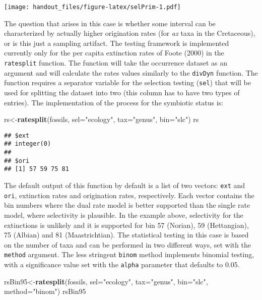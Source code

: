 \documentclass[]{article}
\newenvironment{Shaded}{\begin{snugshade}}{\end{snugshade}}
\newcommand{\DataTypeTok}[1]{\textcolor[rgb]{0.13,0.29,0.53}{#1}}
\newcommand{\KeywordTok}[1]{\textcolor[rgb]{0.13,0.29,0.53}{\textbf{#1}}}
\newcommand{\NormalTok}[1]{#1}
\newcommand{\StringTok}[1]{\textcolor[rgb]{0.31,0.60,0.02}{#1}}
\begin{document}
\texttt{[image: handout\_files/figure-latex/selPrim-1.pdf]}

The question that arises in this case is whether some interval can be
characterized by actually higher origination rates (for \emph{az} taxa
in the Cretaceous), or is this just a sampling artifact. The testing
framework is implemented currently only for the per capita extinction
rates of Foote (2000) in the \texttt{ratesplit} function. The function
will take the occurrence dataset as an argument and will calculate the
rates values similarly to the \texttt{divDyn} function. The function
requires a separator variable for the selection testing (\texttt{sel})
that will be used for splitting the dataset into two (this column has to
have two types of entries). The implementation of the process for the
symbiotic status is:

\begin{Shaded}
\begin{Highlighting}[]
\NormalTok{rs<-}\KeywordTok{ratesplit}\NormalTok{(fossils, }\DataTypeTok{sel=}\StringTok{"ecology"}\NormalTok{, }\DataTypeTok{tax=}\StringTok{"genus"}\NormalTok{, }\DataTypeTok{bin=}\StringTok{"slc"}\NormalTok{)}
\NormalTok{rs}
\end{Highlighting}
\end{Shaded}

\begin{verbatim}
## $ext
## integer(0)
## 
## $ori
## [1] 57 59 75 81
\end{verbatim}

The default output of this function by default is a list of two vectors:
\texttt{ext} and \texttt{ori}, extinction rates and origination rates,
respectively. Each vector contains the bin numbers where the dual rate
model is better supported than the single rate model, where selectivity
is plausible. In the example above, selectivity for the extinctions is
unlikely and it is supported for bin 57 (Norian), 59 (Hettangian), 75
(Albian) and 81 (Maastrichtian). The statistical testing in this case is
based on the number of taxa and can be performed in two different ways,
set with the \texttt{method} argument. The less stringent \texttt{binom}
method implements binomial testing, with a significance value set with
the \texttt{alpha} parameter that defaults to 0.05.

\begin{Shaded}
\begin{Highlighting}[]
\NormalTok{rsBin95<-}\KeywordTok{ratesplit}\NormalTok{(fossils, }\DataTypeTok{sel=}\StringTok{"ecology"}\NormalTok{, }\DataTypeTok{tax=}\StringTok{"genus"}\NormalTok{, }
  \DataTypeTok{bin=}\StringTok{"slc"}\NormalTok{, }\DataTypeTok{method=}\StringTok{"binom"}\NormalTok{)}
\NormalTok{rsBin95}
\end{Highlighting}
\end{Shaded}
\end{document}
